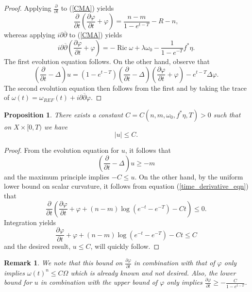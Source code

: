 \documentclass[12pt]{article}
\newtheorem{proposition}[theorem]{Proposition}
\newtheorem{remark}[theorem]{Remark}
\numberwithin{equation}{section}
\renewcommand{\d}{\partial}
\newcommand{\dbar}{\overline{\partial}}
\DeclareMathOperator{\Ric}{Ric}
\newcommand{\parabolic}[1]{\left(\frac{\d}{\d t} - \Delta_{#1}\right)}
\begin{document}
\begin{proof}
Applying $\frac{\d}{\d t}$ to (\ref{CMA}) yields
\begin{equation}\label{time_derivative_eqn}
    \frac{\d}{\d t} \left( \frac{\d \varphi}{\d t} + \varphi\right)
    = \frac{n-m}{1-e^{t-T}} - R - n,
\end{equation}
whereas applying $i\d\dbar$ to (\ref{CMA}) yields
\begin{equation*}
    i\d\dbar\left(\frac{\d \varphi}{\d t} + \varphi\right) = -\Ric\omega + \lambda \omega_0 - \frac{1}{1-e^{-T}} f^* \eta.
\end{equation*}
The first evolution equation follows. On the other hand, observe that
\begin{equation*}
    \parabolic{} u = (1-e^{t-T}) \parabolic{} \left(\frac{\d \varphi}{\d t} + \varphi\right) - e^{t-T} \Delta \varphi.
\end{equation*}
The second evolution equation then follows from the first and by taking the trace of $\omega(t) = \omega_{REF}(t) + i\d\dbar \varphi$.
\end{proof}

\begin{proposition}
There exists a constant $C = C(n,m,\omega_0,f^*\eta, T) > 0$ such that on $X \times [0,T)$ we have
\begin{equation*}
    |u| \leq C.
\end{equation*}
\end{proposition}

\begin{proof}
From the evolution equation for $u$, it follows that
\begin{equation*}
    \parabolic{} u \geq -m
\end{equation*}
and the maximum principle implies $-C \leq u$. On the other hand, by the uniform lower bound on scalar curvature, it follows from equation (\ref{time_derivative_eqn}) that
\begin{equation*}
    \frac{\d }{\d t} \left( \frac{\d \varphi}{\d t} + \varphi + (n-m) \log (e^{-t}-e^{-T}) - Ct\right) \leq 0.
\end{equation*}
Integration yields
\begin{equation*}
    \frac{\d \varphi}{\d t} + \varphi + (n-m) \log (e^{-t}-e^{-T}) - Ct \leq C
\end{equation*}
and the desired result, $u \leq C$, will quickly follow.
\end{proof}

\begin{remark}
We note that this bound on $\frac{\d \varphi}{\d t}$ in combination with that of $\varphi$ only implies $\omega(t)^n \leq C\Omega$ which is already known and not desired. Also, the lower bound for $u$ in combination with the upper bound of $\varphi$ only implies $\frac{\d \varphi}{\d t} \geq -\frac{C}{1-e^{t-T}}$.
\end{remark}
\end{document}
